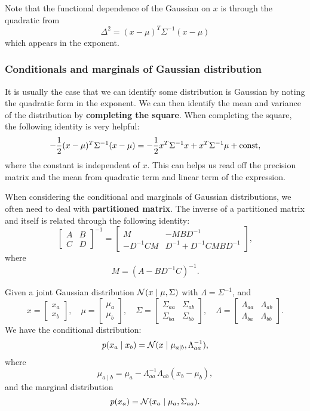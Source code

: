 \documentclass[a4paper]{article}
\begin{document}
Note that the functional dependence of the Gaussian on 
$x$ is through the quadratic from
\[
\Delta^2 = (x - \mu)^T \Sigma^{-1} (x - \mu)
\]
which appears in the exponent. 

\subsubsection{Conditionals and marginals of Gaussian 
distribution}

It is usually the case 
that we can identify some distribution is Gaussian by 
noting the quadratic form in the exponent. We can then 
identify the mean and variance of the distribution by 
\textbf{completing the square}. When completing the square,
the following identity is very helpful:
\[
- \frac{1}{2} (x - \mu)^T \Sigma^{-1} (x - \mu) 
= - \frac{1}{2} x^T \Sigma^{-1} x 
+ x^T \Sigma^{-1} \mu + \mathrm{const},
\]
where the constant is independent of $x$. This can helps 
us read off the precision matrix and the mean from quadratic
term and linear term of the expression.

When considering the conditional and marginals of Gaussian
distributions, we often need to deal with \textbf{partitioned
matrix}. The inverse of a partitioned matrix and itself 
is related through the following identity: 
\[
\begin{bmatrix}
  A & B \\
  C & D
\end{bmatrix}^{-1} 
= 
\begin{bmatrix}
  M & - M B D^{-1} \\
  - D^{-1} C M & D^{-1} + D^{-1} C M B D^{-1}
\end{bmatrix},
\]
where 
\[
M = (A - B D^{-1} C)^{-1}.
\]

\begin{thm}
Given a joint Gaussian distribution $\mathcal{N} (x \mid \mu,
\Sigma)$ with $\Lambda = \Sigma^{-1}$, and 
\[
x = \begin{bmatrix}
  x_a \\
  x_b
\end{bmatrix}, 
\quad 
\mu = \begin{bmatrix}
  \mu_a \\
  \mu_b
\end{bmatrix}, 
\quad 
\Sigma = \begin{bmatrix}
  \Sigma_{aa} & \Sigma_{ab} \\
  \Sigma_{ba} & \Sigma_{bb}
\end{bmatrix}, 
\quad 
\Lambda = \begin{bmatrix}
  \Lambda_{aa} & \Lambda_{ab} \\
  \Lambda_{ba} & \Lambda_{bb}
\end{bmatrix}.
\]
We have the conditional distribution: 
\[
p(x_a \mid x_b) 
= \mathcal{N} (x \mid \mu_{a \mid b}, \Lambda_{aa}^{-1}),
\]
where 
\[
\mu_{a \mid b} = \mu_a - \Lambda_{aa}^{-1} \Lambda_{ab} 
(x_b - \mu_b),
\]
and the marginal distribution 
\[
p(x_a) = \mathcal{N}(x_a \mid \mu_a, \Sigma_{aa}).
\] 
\end{thm}
\end{document}
